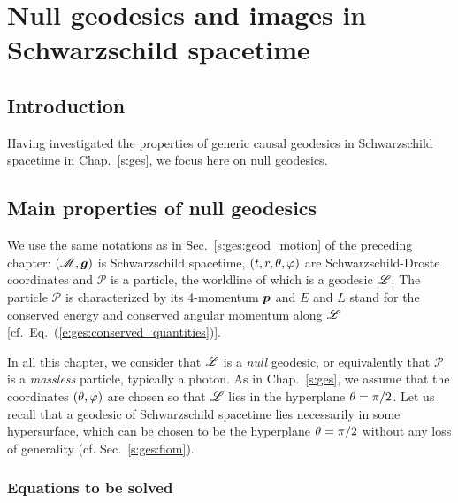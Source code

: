 \chapter{Null geodesics and images in Schwarzschild spacetime}
\label{s:gis}

\minitoc

\section{Introduction}

Having investigated the properties of generic causal geodesics
in Schwarzschild spacetime in Chap.~\ref{s:ges}, we focus here on null
geodesics.



\section{Main properties of null geodesics} \label{s:ges:null}

We use the same notations as in Sec.~\ref{s:ges:geod_motion} of the preceding
chapter: $(\mathscr{M}, \bm{g})$ is Schwarzschild spacetime, $(t,r,\theta,\varphi)$ are
Schwarzschild-Droste coordinates and
$\mathscr{P}$ is a particle, the worldline of which is a
geodesic $\mathscr{L}$. The particle $\mathscr{P}$ is characterized by its
4-momentum $\bm{p}$ and
$E$ and $L$ stand for the conserved energy and conserved angular momentum
along $\mathscr{L}$ [cf.~Eq.~(\ref{e:ges:conserved_quantities})].


In all this chapter, we consider that $\mathscr{L}$ is a \emph{null}
geodesic, or equivalently that
$\mathscr{P}$ is a \emph{massless} particle, typically a photon.
As in Chap.~\ref{s:ges}, we assume that the coordinates $(\theta,\varphi)$ are chosen
so that $\mathscr{L}$ lies in the hyperplane $\theta=\pi/2$. Let us recall that
a geodesic of Schwarzschild spacetime lies necessarily in some hypersurface, which
can be chosen to be the hyperplane $\theta=\pi/2$ without any loss of generality
(cf. Sec.~\ref{s:ges:fiom}).

\subsection{Equations to be solved}

